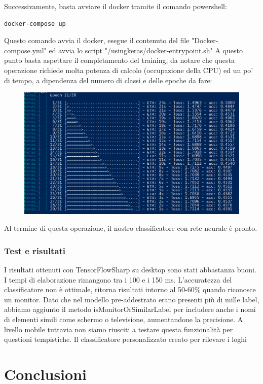 \documentclass[twoside]{supsistudent}
\newcommand{\Decaa}{\newline\vspace{0.5mm}\newline\noindent}
\begin{document}
Successivamente, basta avviare il docker tramite il comando powershell:
\begin{lstlisting}
docker-compose up
\end{lstlisting}
Questo comando avvia il docker, esegue il contenuto del file "Docker-compose.yml" ed avvia lo script "/usingkeras/docker-entrypoint.sh"\Decaa
A questo punto basta aspettare il completamento del training, da notare che questa operazione richiede molta potenza di calcolo (occupazione della CPU) ed un po' di tempo, a dipendenza del numero di classi e delle epoche da fare:

\begin{figure}[h!]
  \centering
    \includegraphics[width=1\textwidth]{Pictures/training.PNG}
\end{figure}
\newline

Al termine di questa operazione, il nostro classificatore con rete neurale è pronto.

\subsection{Test e risultati}%
I risultati ottenuti con TensorFlowSharp su desktop sono stati abbastanza buoni. I tempi di elaborazione rimangono tra i 100 e i 150 ms. L'accuratezza del classificatore non è ottimale, ritorna risultati intorno al 50-60\% quando riconosce un monitor. Dato che nel modello pre-addestrato erano presenti più di mille label, abbiamo aggiunto il metodo isMonitorOrSimilarLabel per includere anche i nomi di elementi simili come schermo o televisione, aumentandone la precisione. A livello mobile tuttavia non siamo riusciti a testare questa funzionalità per questioni tempistiche.
\Decaa
Il classificatore personalizzato creato per rilevare i loghi
\chapter{Conclusioni}
\end{document}
